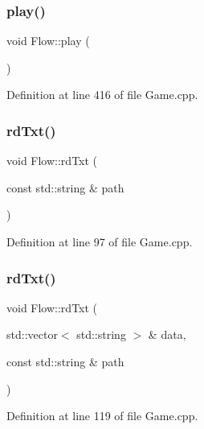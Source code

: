 \subsubsection{\texorpdfstring{play()}{play()}}
{\footnotesize\ttfamily void Flow\+::play (\begin{DoxyParamCaption}{ }\end{DoxyParamCaption})}



Definition at line 416 of file Game.\+cpp.

\hypertarget{namespace_flow_a652e3e72e118566969bd80c132bd4964}{}\label{namespace_flow_a652e3e72e118566969bd80c132bd4964} 
\subsubsection{\texorpdfstring{rd\+Txt()}{rdTxt()}\hspace{0.1cm}{\footnotesize\ttfamily [1/2]}}
{\footnotesize\ttfamily void Flow\+::rd\+Txt (\begin{DoxyParamCaption}\item[{const std\+::string \&}]{path }\end{DoxyParamCaption})}



Definition at line 97 of file Game.\+cpp.

\hypertarget{namespace_flow_a425f80ed9b32235f33d7f38cc7798386}{}\label{namespace_flow_a425f80ed9b32235f33d7f38cc7798386} 
\subsubsection{\texorpdfstring{rd\+Txt()}{rdTxt()}\hspace{0.1cm}{\footnotesize\ttfamily [2/2]}}
{\footnotesize\ttfamily void Flow\+::rd\+Txt (\begin{DoxyParamCaption}\item[{std\+::vector$<$ std\+::string $>$ \&}]{data,  }\item[{const std\+::string \&}]{path }\end{DoxyParamCaption})}



Definition at line 119 of file Game.\+cpp.

\hypertarget{namespace_flow_a18b4909edf24f2acafecf40e42016f98}{}\label{namespace_flow_a18b4909edf24f2acafecf40e42016f98} 

